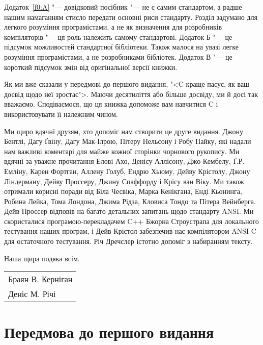 \documentclass[a4paper,12pt]{book}
\newenvironment{signature}[1]%
{\begin{list}{}%
    {\setlength{\leftmargin}{#1}}%
    \item[]%
}
{\end{list}}
\begin{document}
  Додаток~\ref{f0:A} "--- довідковий посібник "--- не є самим стандартом, а
  радше нашим намаганням стисло передати основні риси стандарту. Розділ задумано для
  легкого розуміння програмістами, а не як визначення для розробників компіляторів "---
  ця роль належить самому стандартові. Додаток Б "--- це підсумок
  можливостей стандартної бібліотеки. Також малося на увазі легке розуміння програмістами,
  а не розробниками бібліотек. Додаток В "--- це короткий підсумок
  змін від оригінальної версії книжки.

  Як ми вже сказали у передмові до першого видання, "<C краще пасує, як ваш досвід щодо
  неї зростає">. Маючи десятиліття або більше досвіду, ми й досі так вважаємо.
  Сподіваємося, що ця книжка допоможе вам навчитися C і використовувати її належним
  чином.

  Ми щиро вдячні друзям, хто допоміг нам створити це друге видання. Джону Бентлі, Дагу
  Ґвіну, Дагу Мак-Ілрою, Пітеру Нельсону і Робу Пайку, які надали нам важливі коментарі
  для майже кожної сторінки чорнового рукопису. Ми вдячні за уважне прочитання Елові Ахо,
  Денісу Аллісону, Джо Кембелу, Ґ.Р. Емліну, Карен Фортган, Аллену Голуб, Ендрю Хьюму,
  Дейву Крістолу, Джону Ліндерману, Дейву Проссеру, Джину Спаффорду і Крісу ван Віку. Ми
  також отримали корисні поради від Біла Чесвіка, Марка Кенікгана, Енді Кьонинга, Робина
  Лейка, Тома Лондона, Джима Рідза, Кловиса Тондо та Пітера Вейнберга. Дейв Проссер
  відповів на багато детальних запитань щодо стандарту ANSI. Ми скористалися
  програмою-перекладачем C++ Бжорна Строустрапа для локального тестування наших програм,
  і Дейв Крістол забезпечив нас компілятором ANSI C для остаточного тестування. Річ
  Дречслер істотно допоміг з набиранням тексту.

  Наша щира подяка всім.

  \hfill
  \begin{tabular}{@{}l@{}}
  Браян В. Керніган\\
  Деніс М. Річі
  \end{tabular}

\chapter{Передмова до першого видання}
\end{document}
